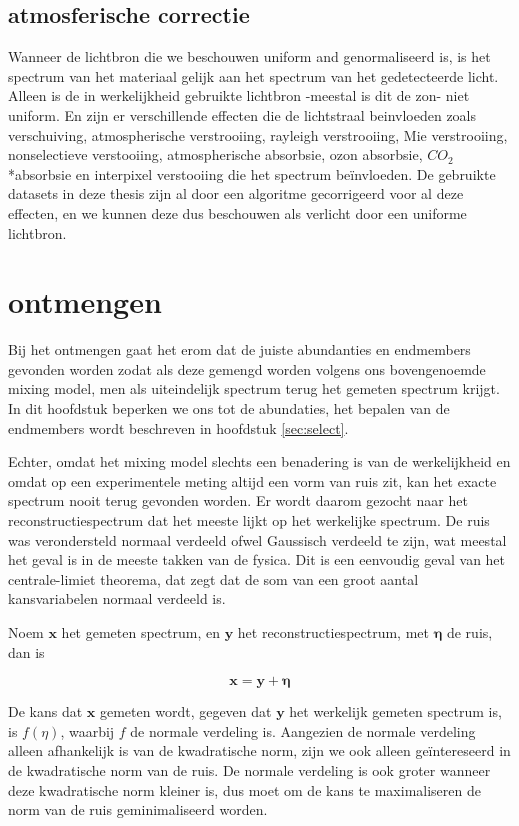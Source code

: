 \documentclass[12pt]{report}
\begin{document}
\subsection{atmosferische correctie}

Wanneer de lichtbron die we beschouwen uniform and genormaliseerd is, is het spectrum van het materiaal gelijk aan het spectrum van het gedetecteerde licht. Alleen is de in werkelijkheid gebruikte lichtbron -meestal is dit de zon- niet uniform. En zijn er verschillende effecten die de lichtstraal beinvloeden\cite{fun} zoals verschuiving, atmospherische verstrooiing, rayleigh verstrooiing, Mie verstrooiing, nonselectieve verstooiing, atmospherische absorbsie, ozon absorbsie, $CO_2$*absorbsie en interpixel verstooiing die het spectrum be\"invloeden. De gebruikte datasets in deze thesis zijn al door een algoritme gecorrigeerd voor al deze effecten, en we kunnen deze dus beschouwen als verlicht door een uniforme lichtbron.

\section{ontmengen}

Bij het ontmengen gaat het erom dat de juiste abundanties en endmembers gevonden worden zodat als deze gemengd worden volgens ons bovengenoemde mixing model, men als uiteindelijk spectrum terug het gemeten spectrum krijgt. In dit hoofdstuk beperken we ons tot de abundaties, het bepalen van de endmembers wordt beschreven in hoofdstuk \ref{sec:select}.

Echter, omdat het mixing model slechts een benadering is van de werkelijkheid en omdat op een experimentele meting altijd een vorm van ruis zit, kan het exacte spectrum nooit terug gevonden worden. Er wordt daarom gezocht naar het reconstructiespectrum dat het meeste lijkt op het werkelijke spectrum. De ruis was verondersteld normaal verdeeld ofwel Gaussisch verdeeld te zijn, wat meestal het geval is in de meeste takken van de fysica. Dit is een eenvoudig geval van het centrale-limiet theorema, dat zegt dat de som van een groot aantal kansvariabelen normaal verdeeld is. 

Noem $\bm{x}$ het gemeten spectrum, en $\bm{y}$ het reconstructiespectrum, met $\bm{\eta}$ de ruis, dan is

\begin{equation}\label{eq:rec}
\bm{x} = \bm{y} + \bm{\eta}
\end{equation}

De kans dat $\bm{x}$ gemeten wordt, gegeven dat $\bm{y}$ het werkelijk gemeten spectrum is, is $f(\eta)$, waarbij $f$ de normale verdeling is. Aangezien de normale verdeling alleen afhankelijk is van de kwadratische norm, zijn we ook alleen ge\"intereseerd in de kwadratische norm van de ruis. De normale verdeling is ook groter wanneer deze kwadratische norm kleiner is, dus moet om de kans te maximaliseren de norm van de ruis geminimaliseerd worden. 
\end{document}
